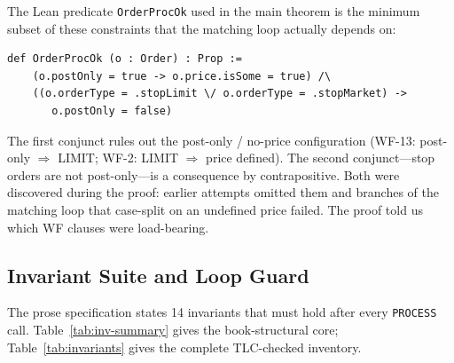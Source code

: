 \documentclass[11pt,a4paper]{article}
\begin{document}
The Lean predicate \texttt{OrderProcOk} used in the main theorem is the
minimum subset of these constraints that the matching loop actually
depends on:

\begin{lstlisting}[language={},basicstyle=\ttfamily\footnotesize]
def OrderProcOk (o : Order) : Prop :=
    (o.postOnly = true -> o.price.isSome = true) /\
    ((o.orderType = .stopLimit \/ o.orderType = .stopMarket) ->
       o.postOnly = false)
\end{lstlisting}

The first conjunct rules out the post-only / no-price configuration
(WF-13: post-only $\Rightarrow$ LIMIT; WF-2: LIMIT $\Rightarrow$ price
defined). The second conjunct---stop orders are not post-only---is a
consequence by contrapositive. Both were discovered during the proof:
earlier attempts omitted them and branches of the matching loop that
case-split on an undefined price failed. The proof told us which WF
clauses were load-bearing.

\subsection{Invariant Suite and Loop Guard}
\label{sec:invariants}

The prose specification states 14 invariants that must hold after every
\texttt{PROCESS} call. Table~\ref{tab:inv-summary} gives the
book-structural core; Table~\ref{tab:invariants} gives the complete
TLC-checked inventory.
\end{document}
